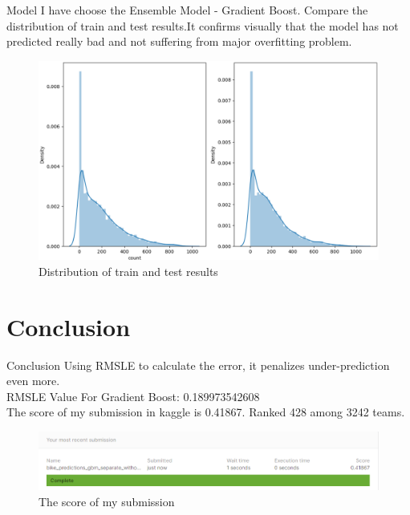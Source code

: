 \documentclass[
 size=14pt,
 paper=smartboard,  %
 mode=present, 		%
 display=slides, 	%
 style=tuliplab,  	%
 pauseslide,
 fleqn,leqno]{powerdot}
\begin{document}
\begin{slide}[toc=,bm=]{Model}
	I have choose the Ensemble Model - Gradient Boost. Compare the distribution of train and test results.It confirms visually that the model has not predicted really bad and not suffering from major overfitting problem.
	\begin{figure}[htbp]
	\includegraphics[scale=0.5]{./figure/models_Figure_1.eps}
	\caption{Distribution of train and test results}
	\end{figure}
\end{slide}

\section{Conclusion}
\begin{slide}[toc=,bm=]{Conclusion}
Using RMSLE to calculate the error, it penalizes under-prediction even more.\\
RMSLE Value For Gradient Boost:  0.189973542608\\
The score of my submission in kaggle is 0.41867. Ranked 428 among 3242 teams.\\
\begin{figure}[htbp]
	\includegraphics[scale=0.8]{./figure/428-3242.eps}
	\caption{The score of my submission}
\end{figure}


\end{slide}
\end{document}
